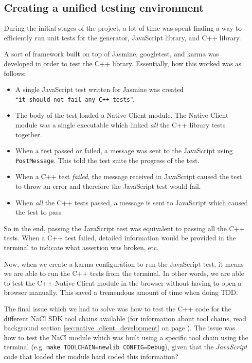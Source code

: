 \subsection{Creating a unified testing environment} %
\label{sub:creating_a_testing_framework}
During the initial stages of the project, a lot of time was spent finding a way to efficiently run unit tests for the generator, JavaScript library, and C++ library. 

A sort of framework built on top of Jasmine, googletest, and karma was developed in order to test the C++ library. Essentially, how this worked was as follows:

\begin{itemize}
	\item A single JavaScript test written for Jasmine was created \\
	``\lstinline{it should not fail any C++ tests}''. 
	\item The body of the test loaded a Native Client module. The Native Client module was a single executable which linked \emph{all} the C++ library tests together.
	\item When a test passed or failed, a message was sent to the JavaScript using \lstinline{PostMessage}. This told the test suite the progress of the test.
	\item When a C++ test \emph{failed}, the message received in JavaScript caused the test to throw an error and therefore the JavaScript test would fail.
	\item When \emph{all} the C++ tests passed, a message is sent to JavaScript which caused the test to pass
\end{itemize}

So in the end, passing the JavaScript test was equivalent to passing all the C++ tests. When a C++ test failed, detailed information would be provided in the terminal to indicate what assertion was broken, etc. 

Now, when we create a karma configuration to run the JavaScript test, it means we are able to run the C++ tests from the terminal. In other words, we are able to test the C++ Native Client module in the browser without having to open a browser manually. This saved a tremendous amount of time when doing TDD.

The final issue which we had to solve was how to test the C++ code for the different NaCl SDK tool chains available (for information about tool chains, read background section \ref{sec:native_client_development} on page \pageref{sec:native_client_development}). The issue was how to test the NaCl module which was built using a specific tool chain using the terminal (e.g. \lstinline{make TOOLCHAIN=newlib CONFIG=Debug}), given that the \emph{JavaScript} code that loaded the module hard coded this information? 

